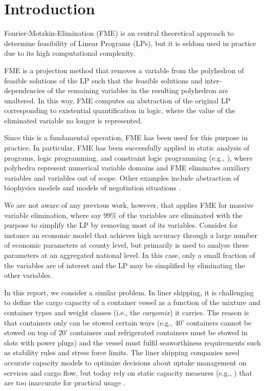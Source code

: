 
\section{Introduction}

Fourier-Motzkin-Elimination (FME) is an central theoretical approach to determine feasibility of Linear Programs (LPs), but it is seldom used in practice due to its high computational complexity.

FME is a projection method that removes a variable from the polyhedron of feasible solutions of the LP such that the feasible solutions and inter-dependencies of the remaining variables in the resulting polyhedron are unaltered. In this way, FME computes an abstraction of the original LP corresponding to existential quantification in logic, where the value of the eliminated variable no longer is represented.

Since this is a fundamental operation, FME has been used for this purpose in practice. 
In particular, FME has been successfully applied in static analysis of programs, logic programming, and constraint logic programming (e.g., \cite{fouilhe,cousot78,benoy05,simon10,jaffar93}), where polyhedra represent 
numerical variable domains and FME eliminates auxiliary variables and variables out of scope. Other examples include abstraction of biophysics models and models of negotiation situations \cite{lukatskii08}.

We are not aware of any previous work, however, that applies FME for massive variable elimination, where say 99\% of the variables are eliminated with the purpose to simplify the LP by removing most of its variables. Consider for instance an economic model that achieves high accuracy through a large number of economic parameters at county level, but primarily is used to analyse these parameters at an aggregated national level. In this case, only a small fraction of the variables are of interest and the LP may be simplified by eliminating the other variables.

In this report, we consider a similar problem. In liner shipping, it is challenging to define the cargo capacity of a container vessel as a function of the mixture and container types and weight classes (i.e., the {\em cargomix}) it carries. The reason is that containers only can be stowed certain ways (e.g., 40' containers cannot be stowed on top of 20' containers and refrigerated containers must be stowed in slots with power plugs) and the vessel must fulfil seaworthiness requirements such as stability rules and stress force limits. The liner shipping companies need accurate capacity models to optimize decisions about uptake management on services and cargo flow, but today rely on static capacity measures (e.g., \cite{ting04,feng08,zurheide13}) that are too inaccurate  for practical usage \cite{AlbertosThesis}.

